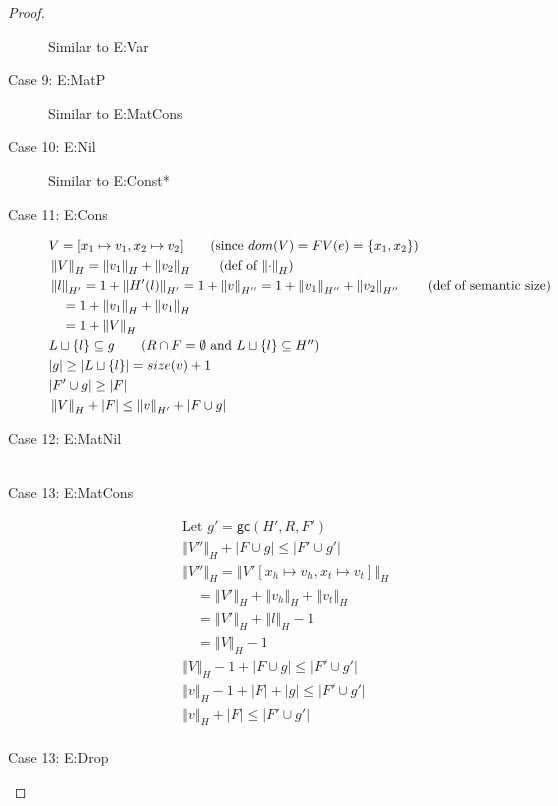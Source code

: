 \documentclass[11pt]{article}
\newcommand{\ssize}[2]{\left\Vert #2 \right\Vert_{#1}}
\newcommand{\gc}[3]{\mathsf{gc}(#1,#2,#3)}
\theoremstyle{definition}
\begin{document}
\begin{proof}
\begin{description}
  Similar to E:Var
  \item[Case 9: E:MatP]
  Similar to E:MatCons
  \item[Case 10: E:Nil]
  Similar to E:Const*
  \item[Case 11: E:Cons]
  \begin{align*}
  &V = [x_1 \mapsto v_1,x_2 \mapsto v_2] \tag{since $dom(V) = FV(e) = \{x_1,x_2\}$}\\
  &\ssize{H}{V} = \ssize{H}{v_1} + \ssize{H}{v_2} \tag{def of $\ssize{H}{\cdot}$}\\
  &\ssize{H'}{l} = 1 + \ssize{H'}{H'(l)} = 1 + \ssize{H''}{v} = 1 + \ssize{H''}{v_1} + \ssize{H''}{v_2}
  \tag{def of semantic size}\\
  &\quad = 1 + \ssize{H}{v_1} + \ssize{H}{v_1}\\
  &\quad = 1 + \ssize{H}{V}\\
  &L \sqcup \{l\} \subseteq g \tag{$R \cap F = \emptyset$ and $L \sqcup \{l\} \subseteq H''$}\\
  &|g| \ge |L \sqcup \{l\}| = size(v) + 1\\
  &|F' \cup g| \ge |F|\\
  &\ssize{H}{V} + |F| \le \ssize{H'}{v} + |F \cup g|\\
  \end{align*}
  \item[Case 12: E:MatNil]
  \begin{align*}
  \end{align*}
  \item [Case 13: E:MatCons]
  \begin{align*}
  &\text{Let } g' = \gc{H'}{R}{F'}\\
  &\ssize{H}{V''}  + |F \cup g| \le |F' \cup g'| \tag{IH (wfc from main lemma)}\\
  &\ssize{H}{V''} = \ssize{H}{V'[x_h \mapsto v_h, x_t \mapsto v_t]}\\
  &\quad = \ssize{H}{V'} + \ssize{H}{v_h} + \ssize{H}{v_t}\\
  &\quad = \ssize{H}{V'} + \ssize{H}{l} - 1\\
  &\quad = \ssize{H}{V} - 1\\
  &\ssize{H}{V} - 1 + |F \cup g| \le |F' \cup g'|\\
  &\ssize{H}{v} - 1 + |F| + |g| \le |F' \cup g'| \tag{$F \cap g = \emptyset$}\\
  &\ssize{H}{v} + |F| \le |F' \cup g'| \tag{$|g| \ge 1$ from main lemma}\\
  \end{align*}
  \item [Case 13: E:Drop]

\end{description}
\end{proof}
\end{document}

